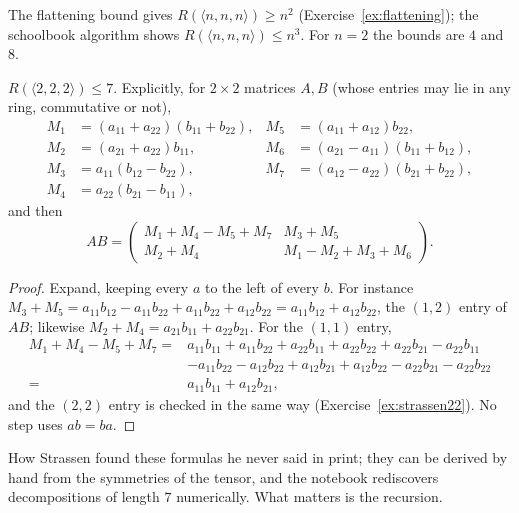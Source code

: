 The flattening bound gives $R(\langle n,n,n\rangle)\ge n^2$ (Exercise~\ref{ex:flattening}); the schoolbook algorithm shows
$R(\langle n,n,n\rangle)\le n^3$. For $n=2$ the bounds are $4$ and $8$.

\begin{theorem}[Strassen, 1969]\label{thm:strassen}
$R(\langle2,2,2\rangle)\le7$. Explicitly, for $2\times2$ matrices $A,B$ (whose entries may lie in any ring, commutative or not),
\[
\begin{aligned}
M_1&=(a_{11}+a_{22})(b_{11}+b_{22}),&M_5&=(a_{11}+a_{12})b_{22},\\
M_2&=(a_{21}+a_{22})b_{11},&M_6&=(a_{21}-a_{11})(b_{11}+b_{12}),\\
M_3&=a_{11}(b_{12}-b_{22}),&M_7&=(a_{12}-a_{22})(b_{21}+b_{22}),\\
M_4&=a_{22}(b_{21}-b_{11}),
\end{aligned}
\]
and then
\[
AB=\begin{pmatrix}M_1+M_4-M_5+M_7&M_3+M_5\\M_2+M_4&M_1-M_2+M_3+M_6\end{pmatrix}.
\]
\end{theorem}
\begin{proof}
Expand, keeping every $a$ to the left of every $b$. For instance $M_3+M_5=a_{11}b_{12}-a_{11}b_{22}+a_{11}b_{22}+a_{12}b_{22}=
a_{11}b_{12}+a_{12}b_{22}$, the $(1,2)$ entry of $AB$; likewise $M_2+M_4=a_{21}b_{11}+a_{22}b_{21}$. For the $(1,1)$ entry,
\[
\begin{aligned}
M_1+M_4-M_5+M_7={}&a_{11}b_{11}+a_{11}b_{22}+a_{22}b_{11}+a_{22}b_{22}+a_{22}b_{21}-a_{22}b_{11}\\
&-a_{11}b_{22}-a_{12}b_{22}+a_{12}b_{21}+a_{12}b_{22}-a_{22}b_{21}-a_{22}b_{22}\\
={}&a_{11}b_{11}+a_{12}b_{21},
\end{aligned}
\]
and the $(2,2)$ entry is checked in the same way (Exercise~\ref{ex:strassen22}). No step uses $ab=ba$.
\end{proof}

How Strassen found these formulas he never said in print; they can be derived by hand from the symmetries of the tensor, and
the notebook rediscovers decompositions of length $7$ numerically. What matters is the recursion.

